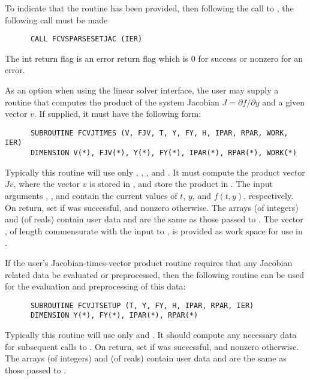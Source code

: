 \begin{Steps}
  To indicate that the  routine has been provided, then
  following the call to , the following call must be made    
\begin{verbatim}
      CALL FCVSPARSESETJAC (IER)
\end{verbatim}
  The int return flag  is an error return flag which is $0$
  for success or nonzero for an error.\\

 

  As an option when using the {\cvls} linear solver interface, 
  the user may supply a routine that computes the product of the system Jacobian 
  $J = \partial f / \partial y$ 
  and a given vector $v$.  If supplied, it must have the following form:
\begin{verbatim}
      SUBROUTINE FCVJTIMES (V, FJV, T, Y, FY, H, IPAR, RPAR, WORK, IER)
      DIMENSION V(*), FJV(*), Y(*), FY(*), IPAR(*), RPAR(*), WORK(*)
\end{verbatim}
  Typically this routine will use only , , , and
  .  It must compute the product vector $Jv$, where the vector $v$ is
  stored in , and store the product in .  
  The input arguments , , and  contain the current
  values of $t$, $y$, and $f(t,y)$, respectively.  On return, set
   if  was successful, and nonzero otherwise.
  The arrays  (of integers) and  (of reals) contain user data
  and are the same as those passed to .
  The vector , of length commensurate with the input 
  to , is provided as work space for use in .

  If the user's Jacobian-times-vector product routine requires that
  any Jacobian related data be evaluated or preprocessed, then the
  following routine can be used for the evaluation and preprocessing
  of this data:
\begin{verbatim}
      SUBROUTINE FCVJTSETUP (T, Y, FY, H, IPAR, RPAR, IER)
      DIMENSION Y(*), FY(*), IPAR(*), RPAR(*)
\end{verbatim}
  Typically this routine will use only  and .  It should
  compute any necessary data for subsequent calls to .  On return, set
   if  was successful, and nonzero otherwise.
  The arrays  (of integers) and  (of reals) contain user data
  and are the same as those passed to .


\end{Steps}
